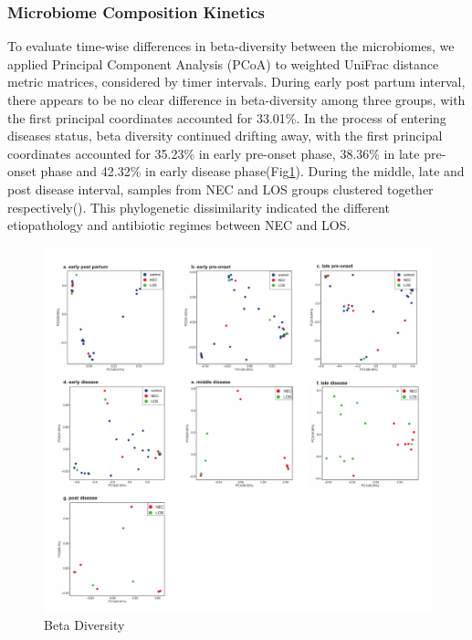 \documentclass[fleqn,10pt,lineno]{wlpeerj} %
\begin{document}
    \subsubsection*{Microbiome Composition Kinetics}
    To evaluate time-wise differences in beta-diversity between the microbiomes, we applied Principal Component Analysis (PCoA) to weighted UniFrac distance metric matrices, considered by timer intervals. During early post partum interval, there appears to be no clear difference in beta-diversity among three groups, with the first principal coordinates accounted for 33.01\%. In the process of entering diseases status, beta diversity continued drifting away, with the first principal coordinates accounted for 35.23\% in early pre-onset phase, 38.36\% in late pre-onset phase and 42.32\% in early disease phase(Fig\ref{fig:pcoa}).
    During the middle, late and post disease interval, samples from NEC and LOS groups clustered together respectively(). This phylogenetic dissimilarity indicated the different etiopathology and antibiotic regimes between NEC and LOS.
    \begin{figure}[ht]\centering
      \includegraphics[width=\linewidth]{figure/pcoa_time_group.pdf}
      \caption{Beta Diversity}
      \label{fig:pcoa}
    \end{figure}


\end{document}
